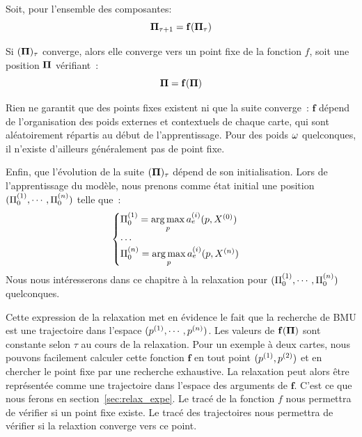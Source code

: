 \documentclass[../main]{subfiles}
\begin{document}
Soit, pour l'ensemble des composantes: 
\begin{equation}
\mathbf{\Pi}_{\tau+1} = \mathbf{f}(\mathbf{\Pi}_\tau)
\end{equation}

Si $(\mathbf{\Pi})_\tau$ converge, alors elle converge vers un point fixe de la fonction $f$, soit une position $\mathbf{\Pi}$ vérifiant~:
\begin{equation}
\mathbf{\Pi} = \mathbf{f}(\mathbf{\Pi})
\label{eq:suite}
\end{equation}

Rien ne garantit que des points fixes existent ni que la suite converge~: $\mathbf{f}$ dépend de l'organisation des poids externes et contextuels de chaque carte, qui sont aléatoirement répartis au début de l'apprentissage.
Pour des poids $\omega$ quelconques, il n'existe d'ailleurs généralement pas de point fixe.

Enfin, que l'évolution de la suite $(\mathbf{\Pi})_{\tau}$ dépend de son initialisation.
Lors de l'apprentissage du modèle, nous prenons comme état initial une position $(\Pi^{({1})}_0, \cdots , \Pi^{({n})}_0)$  telle que~: 
\begin{equation}
\begin{cases}
\Pi^{({1})}_0 = \operatorname*{arg\,max}\limits_p a_e^{({i})}(p,X^{({0})})\\
\cdots \\
\Pi^{({n})}_0 = \operatorname*{arg\,max}\limits_p a_e^{({i})}(p,X^{({n})})\\
\end{cases}
\label{eq:init}
\end{equation}
Nous nous intéresserons dans ce chapitre à la relaxation pour $(\Pi^{({1})}_0, \cdots , \Pi^{({n})}_0)$ quelconques.

Cette expression de la relaxation met en évidence le fait que la recherche de BMU est une trajectoire dans l'espace $(p^{({1})}, \cdots, p^{({n})})$. Les valeurs de $\mathbf{f}(\mathbf{\Pi})$ sont constante selon $\tau$ au cours de la relaxation.
Pour un exemple à deux cartes, nous pouvons facilement calculer cette fonction $\mathbf{f}$ en tout point $(p^{({1})}, p^{({2})})$ et en chercher le point fixe par une recherche exhaustive. La relaxation peut alors être représentée comme une trajectoire dans l'espace des arguments de $\mathbf{f}$.
C'est ce que nous ferons en section~\ref{sec:relax_expe}.
Le tracé de la fonction $f$  nous permettra de vérifier si un point fixe existe. Le tracé des trajectoires nous permettra de vérifier si la relaxtion converge vers ce point.
\end{document}
